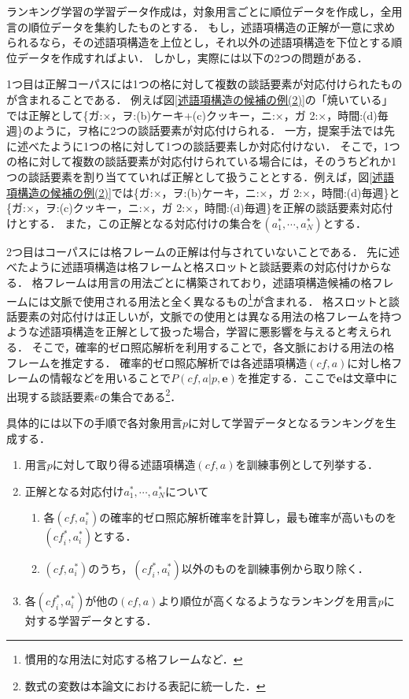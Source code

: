 \documentclass[japanese]{jnlp_1.4}
\begin{document}
ランキング学習の学習データ作成は，対象用言ごとに順位データを作成し，全用言の順位データを集約したものとする．
もし，述語項構造の正解が一意に求められるなら，その述語項構造を上位とし，それ以外の述語項構造を下位とする順位データを作成すればよい．
しかし，実際には以下の2つの問題がある．

1つ目は正解コーパスには1つの格に対して複数の談話要素が対応付けられたものが含まれることである．
例えば図\ref{述語項構造の候補の例(2)}の「焼いている」では正解として\{ガ:×，ヲ:(b)ケーキ+(c)クッキー，ニ:×，ガ 2:×，時間:(d)毎週\}のように，ヲ格に2つの談話要素が対応付けられる．
一方，提案手法では先に述べたように1つの格に対して1つの談話要素しか対応付けない．
そこで，1つの格に対して複数の談話要素が対応付けられている場合には，そのうちどれか1つの談話要素を割り当てていれば正解として扱うこととする．例えば，図\ref{述語項構造の候補の例(2)}では\{ガ:×，ヲ:(b)ケーキ，ニ:×，ガ 2:×，時間:(d)毎週\}と\{ガ:×，ヲ:(c)クッキー，ニ:×，ガ 2:×，時間:(d)毎週\}を正解の談話要素対応付けとする．
また，この正解となる対応付けの集合を$(a^{*}_{1},\cdots,a^{*}_{N})$とする．

2つ目はコーパスには格フレームの正解は付与されていないことである．
先に述べたように述語項構造は格フレームと格スロットと談話要素の対応付けからなる．
格フレームは用言の用法ごとに構築されており，述語項構造候補の格フレームには文脈で使用される用法と全く異なるもの\footnote{慣用的な用法に対応する格フレームなど．}が含まれる．
格スロットと談話要素の対応付けは正しいが，文脈での使用とは異なる用法の格フレームを持つような述語項構造を正解として扱った場合，学習に悪影響を与えると考えられる．
そこで，確率的ゼロ照応解析\cite{sasano-kawahara-kurohashi:2008:PAPERS}を利用することで，各文脈における用法の格フレームを推定する．
確率的ゼロ照応解析では各述語項構造$(\mathit{cf},a)$に対し格フレームの情報などを用いることで$P(\mathit{cf},\mathit{a|p},\mathbf{e})$を推定する．ここで$\mathbf{e}$は文章中に出現する談話要素$e$の集合である\footnote{数式の変数は本論文における表記に統一した．}．

具体的には以下の手順で各対象用言$p$に対して学習データとなるランキングを生成する．
\begin{enumerate}
 \item 用言$p$に対して取り得る述語項構造$(\mathit{cf},a)$を訓練事例として列挙する．
	   \label{190308_16Oct13}
 \item 正解となる対応付け$a^{*}_{1},\cdots,a^{*}_{N}$について
 \begin{enumerate}
  \item 各$(\mathit{cf}, a^*_{i})$の確率的ゼロ照応解析確率を計算し，最も確率が高いものを$(\mathit{cf}^*_{i}, a^*_{i})$とする．
		\label{190424_16Oct13}
  \item $(\mathit{cf}, a^*_{i})$のうち，$(\mathit{cf}^*_{i},a^*_{i})$以外のものを訓練事例から取り除く．
		\label{190439_16Oct13}
 \end{enumerate}
 \item 各$(\mathit{cf}^*_{i},a^*_{i})$が他の$(\mathit{cf},a)$より順位が高くなるようなランキングを用言$p$に対する学習データとする．
	   \label{190449_16Oct13}
\end{enumerate}
\end{document}
